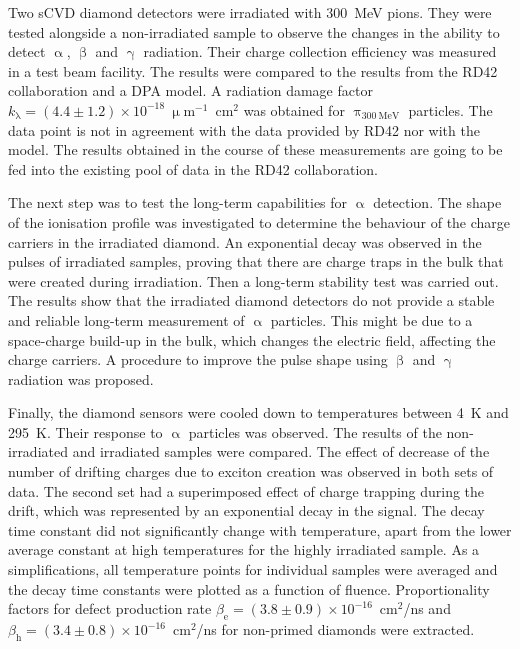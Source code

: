 Two sCVD diamond detectors were irradiated with 300~MeV pions. They were tested alongside a non-irradiated sample to observe the changes in the ability to detect $\upalpha$, $\upbeta$ and $\upgamma$ radiation. Their charge collection efficiency was measured in a test beam facility. The results were compared to the results from the RD42 collaboration and a DPA model. A radiation damage factor $k_{\mathrm{\lambda}}=(4.4\pm1.2)\times10^{-18}~\upmu$m$^{-1}$~cm$^{2}$ was obtained for $\uppi_{\mathrm{300~MeV}}$ particles. The data point is not in agreement with the data provided by RD42 nor with the model. %
The results obtained in the course of these measurements are going to be fed into the existing pool of data in the RD42 collaboration.

The next step was to test the long-term capabilities for $\upalpha$ detection. The shape of the ionisation profile was investigated to determine the behaviour of the charge carriers in the irradiated diamond. An exponential decay was observed in the pulses of irradiated samples, proving that there are charge traps in the bulk that were created during irradiation. Then a long-term stability test was carried out. The results show that the irradiated diamond detectors do not provide a stable and reliable long-term measurement of $\upalpha$ particles. This might be due to a space-charge build-up in the bulk, which changes the electric field, affecting the charge carriers. A procedure to improve the pulse shape using $\upbeta$ and $\upgamma$ radiation was proposed.

Finally, the diamond sensors were cooled down to temperatures between 4~K and 295~K. Their response to $\upalpha$ particles was observed. The results of the non-irradiated and irradiated samples were compared. The effect of decrease of the number of drifting charges due to exciton creation was observed in both sets of data. The second set had a superimposed effect of charge trapping during the drift, which was represented by an exponential decay in the signal. The decay time constant did not significantly change with temperature, apart from the lower average constant at high temperatures for the highly irradiated sample. As a simplifications, all temperature points for individual samples were averaged and the decay time constants were plotted as a function of fluence. Proportionality factors for defect production rate $\beta_\mathrm{e}=(3.8\pm0.9)\times10^{-16}$~cm$^2$/ns and $\beta_\mathrm{h}=(3.4\pm0.8)\times10^{-16}$~cm$^2$/ns for non-primed diamonds were extracted. 

